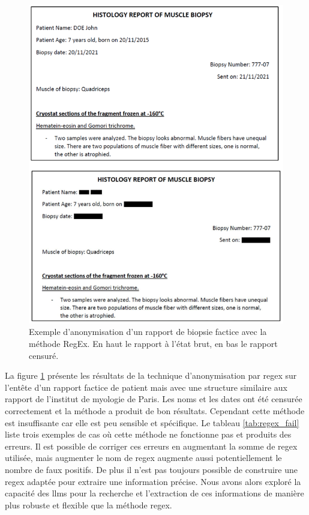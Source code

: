 \begin{figure}[htbp]
  \centering
  \includegraphics[width=1\textwidth]{figures/regex.png}
  \caption[Exemple anonymisation RegEx]{Exemple d'anonymisation d'un rapport de biopsie factice avec la méthode RegEx. En haut le rapport à l'état brut, en bas le rapport censuré.}
  \label{fig:regex}
\end{figure}
La figure \ref{fig:regex}  présente les résultats de la technique d'anonymisation par \gls{regex} sur l'entête d'un rapport factice de patient mais avec une structure similaire aux rapport de l'institut de myologie de Paris. Les noms et les dates ont été censurée correctement et la méthode a produit de bon résultats. Cependant cette méthode est insuffisante car elle est peu sensible et spécifique. Le tableau \ref{tab:regex_fail} liste trois exemples de cas où cette méthode ne fonctionne pas et produits des erreurs. Il est possible de corriger ces erreurs en augmentant la somme de \gls{regex} utilisée, mais augmenter le nom de \gls{regex} augmente aussi potentiellement le nombre de faux positifs. De plus il n'est pas toujours possible de construire une \gls{regex} adaptée pour extraire une information précise. Nous avons alors exploré la capacité des \gls{llms} pour la recherche et l'extraction de ces informations de manière plus robuste et flexible que la méthode \gls{regex}.
